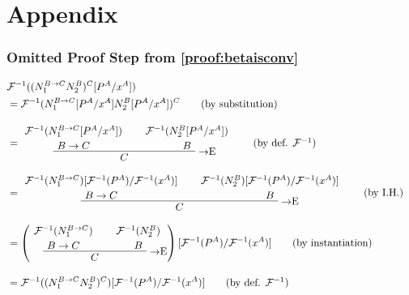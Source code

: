 \chapter*{Appendix}

\subsection*{Omitted Proof Step from \ref{proof:betaisconv}}
\begin{align*}
\lefteqn{\chmapantasub{(N_1^{B \to C}N_2^B)^C}{P^A}{x^A}} \\
  &=
  \chmapanta{(N_1^{B \to C}[P^A/x^A]N_2^B[P^A/x^A])^C}
  \tag{by substitution} \\[10pt]
  &=
  \implelim{%
    \AxiomC{$\chmapantasub{N_1^{B \to C}}{P^A}{x^A}$}\noLine\UnaryInfC{$B \to C$}
  }{%
    \AxiomC{$\chmapantasub{N_2^B}{P^A}{x^A}$}\noLine\UnaryInfC{$B$}
  }{$C$}
  \DisplayProof
  \tag{by def. $\chmapanta$} \\[10pt]
  &=
  \implelim{%
    \AxiomC{$\subchmapanta{N_1^{B \to C}}{P^A}{x^A}$}\noLine\UnaryInfC{$B \to C$}
  }{%
    \AxiomC{$\subchmapanta{N_2^B}{P^A}{x^A}$}\noLine\UnaryInfC{$B$}
  }{$C$}
  \DisplayProof
  \tag{by I.H.} \\[10pt]
  &=
  \left(
  \implelim{%
    \AxiomC{$\chmapanta(N_1^{B \to C})$}\noLine\UnaryInfC{$B \to C$}
  }{%
    \AxiomC{$\chmapanta(N_2^B)$}\noLine\UnaryInfC{$B$}
  }{$C$}
  \DisplayProof
  \right)[\chmapanta(P^A)/\chmapanta(x^A)]
  \tag{by instantiation} \\[10pt]
  &=
  \subchmapanta{(N_1^{B \to C}N_2^B)^C}{P^A}{x^A}
  \tag{by def. $\chmapanta$}
\end{align*}

